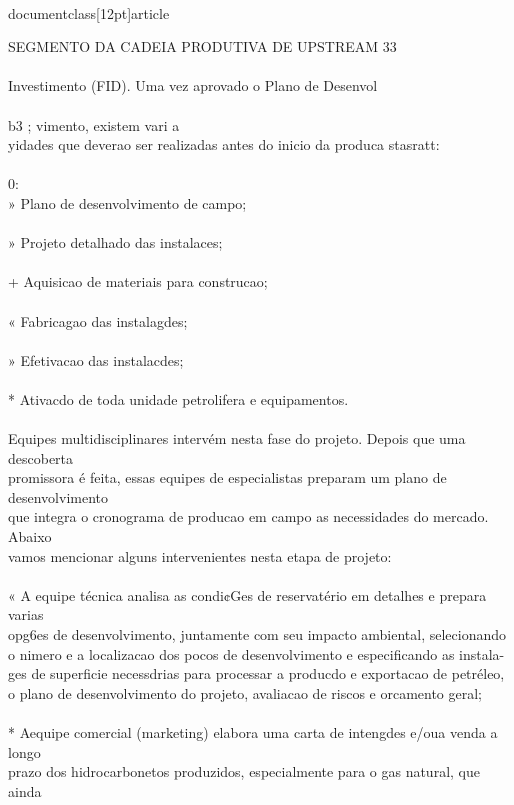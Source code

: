 \\documentclass[12pt]{article}
\begin{document}
SEGMENTO DA CADEIA PRODUTIVA DE UPSTREAM 33\\
\\
Investimento (FID). Uma vez aprovado o Plano de Desenvol\\
\\
b3 ; vimento, existem vari a\\
yidades que deverao ser realizadas antes do inicio da produca stasratt:\\
\\
0:\\
» Plano de desenvolvimento de campo;\\
\\
» Projeto detalhado das instalaces;\\
\\
+ Aquisicao de materiais para construcao;\\
\\
« Fabricagao das instalagdes;\\
\\
» Efetivacao das instalacdes;\\
\\
* Ativacdo de toda unidade petrolifera e equipamentos.\\
\\
Equipes multidisciplinares intervém nesta fase do projeto. Depois que uma descoberta\\
promissora é feita, essas equipes de especialistas preparam um plano de desenvolvimento\\
que integra o cronograma de producao em campo as necessidades do mercado. Abaixo\\
vamos mencionar alguns intervenientes nesta etapa de projeto:\\
\\
« A equipe técnica analisa as condi¢Ges de reservatério em detalhes e prepara varias\\
opg6es de desenvolvimento, juntamente com seu impacto ambiental, selecionando\\
o nimero e a localizacao dos pocos de desenvolvimento e especificando as instala-\\
ges de superficie necessdrias para processar a producdo e exportacao de petréleo,\\
o plano de desenvolvimento do projeto, avaliacao de riscos e orcamento geral;\\
\\
* Aequipe comercial (marketing) elabora uma carta de intengdes e/oua venda a longo\\
prazo dos hidrocarbonetos produzidos, especialmente para o gas natural, que ainda\\
\end{document}
